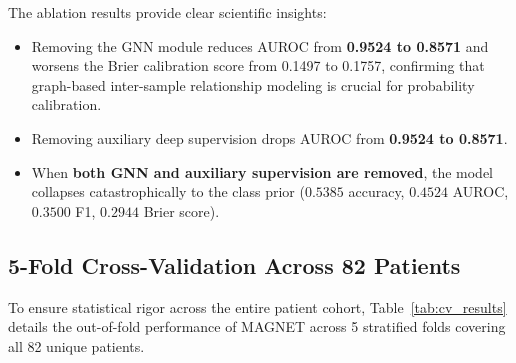 \documentclass[conference]{IEEEtran}
\begin{document}
The ablation results provide clear scientific insights:
\begin{itemize}
    \item Removing the GNN module reduces AUROC from \textbf{0.9524 to 0.8571} and worsens the Brier calibration score from 0.1497 to 0.1757, confirming that graph-based inter-sample relationship modeling is crucial for probability calibration.
    \item Removing auxiliary deep supervision drops AUROC from \textbf{0.9524 to 0.8571}.
    \item When \textbf{both GNN and auxiliary supervision are removed}, the model collapses catastrophically to the class prior ($0.5385$ accuracy, $0.4524$ AUROC, $0.3500$ F1, $0.2944$ Brier score).
\end{itemize}

\subsection{5-Fold Cross-Validation Across 82 Patients}
To ensure statistical rigor across the entire patient cohort, Table~\ref{tab:cv_results} details the out-of-fold performance of MAGNET across 5 stratified folds covering all 82 unique patients.

\begin{table}[!t]
\centering
\caption{MAGNET 5-Fold Cross-Validation Across All 82 Patients}
\label{tab:cv_results}
\end{table}
\end{document}
